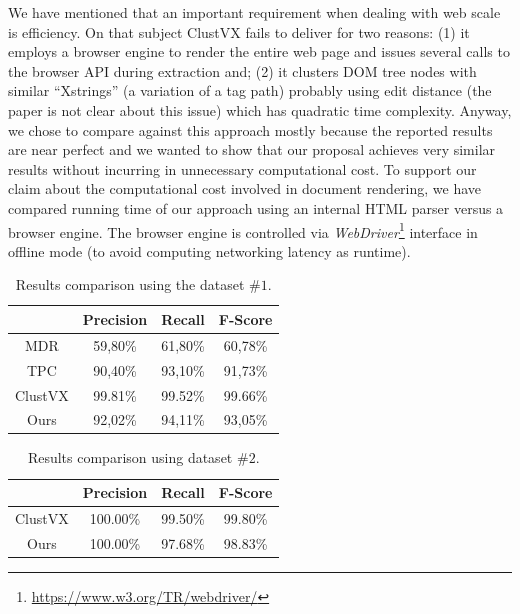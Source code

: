 We have mentioned that an important requirement when dealing with web scale is
efficiency. On that subject ClustVX fails to deliver for two reasons: (1) it
employs a browser engine to render the entire web page and issues several calls
to the browser API during extraction and; (2) it clusters DOM tree nodes with
similar ``Xstrings'' (a variation of a tag path) probably using edit distance
(the paper is not clear about this issue) which has quadratic time complexity.
Anyway, we chose to compare against this approach mostly because the reported
results are near perfect and we wanted to show that our proposal achieves very
similar results without incurring in unnecessary computational cost. To support
our claim about the computational cost involved in document rendering, we have
compared running time of our approach using an internal HTML parser versus a
browser engine. The browser engine is controlled via
\textit{WebDriver}\footnote{\url{https://www.w3.org/TR/webdriver/}} interface in
offline mode (to avoid computing networking latency as runtime).

\begin{table}[h]
\centering
\caption{\small{Results comparison using the dataset $\#1$.}}
\label{table:compare1}
\begin{small}
\begin{tabular}
{|c| c| c| c|}\hline
	& Precision	& Recall	& F-Score\\ \hline
MDR\cite{MDR03} &	59,80\%	& 61,80\%	& 60,78\%\\ \hline
TPC\cite{TPC09}	& 90,40\%	& 93,10\%	& 91,73\%\\ \hline
ClustVX\cite{grigalis2013towards} &	99.81\% & 99.52\% & 99.66\%\\ \hline
Ours &	92,02\%	& 94,11\%	& 93,05\% \\ \hline
\end{tabular}
\end{small}
\end{table}

\begin{table}[h]
\centering
\caption{\small{Results comparison using dataset $\#2$.}}
\label{table:compare2}
\begin{small}
\begin{tabular}
{|c| c| c| c|}\hline
	& Precision	& Recall	& F-Score\\ \hline
ClustVX\cite{grigalis2013towards} &	100.00\% & 99.50\% & 99.80\%\\ \hline
Ours &	100.00\% & 97.68\% & 98.83\% \\ \hline
\end{tabular}
\end{small}
\end{table}

